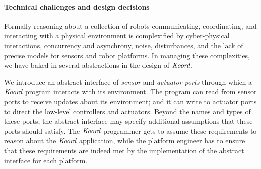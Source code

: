 \paragraph{Technical challenges and design decisions}
Formally reasoning about a collection of robots communicating, coordinating, and interacting with a physical environment is complexified by  cyber-physical interactions, concurrency and asynchrony, noise, disturbances, and the lack of precise models for sensors and robot platforms. In managing these complexities, we have baked-in several abstractions in the design of $\emph{Koord}$.
%

\begin{noinditem}
\item We introduce an abstract interface of \emph{sensor} and \emph{actuator ports} through which a $\emph{Koord}$ program interacts with its environment. The program can read from sensor ports to receive updates about its environment;  and it can write to actuator ports to direct the low-level controllers and actuators. Beyond the names and types of these ports, the abstract interface may specify additional assumptions  that these ports should satisfy. The $\emph{Koord}$ programmer gets to assume these requirements to reason about the $\emph{Koord}$ application, while the platform engineer has to ensure that these requirements are indeed met by the implementation of the abstract interface for each platform.



\end{noinditem}
